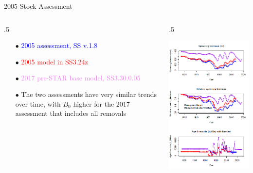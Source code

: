 \documentclass[ignorenonframetext,]{beamer}
\def\begincols{\begin{columns}}
\def\begincol{\begin{column}}
\def\endcol{\end{column}}
\def\endcols{\end{columns}}
\begin{document}
\begin{frame}{2005 Stock Assessment}

\begincols
 \begincol{.5\textwidth}

\begin{itemize}
\item[$\bullet$] \textcolor{blue}{2005 assessment, SS v.1.8}
\item[$\bullet$] \textcolor{red}{2005 model in SS3.24z}
\item[$\bullet$] \textcolor{violet}{2017 pre-STAR base model, SS3.30.0.05}
\item[$\bullet$] The two assessments have very similar trends over time, with $B_0$ higher for the 2017 assessment that includes all removals
\end{itemize}

\endcol
 \begincol{.5\textwidth}

\includegraphics{Figures/bridge_timeseries.png}

\endcol
\endcols

\end{frame}
\end{document}
